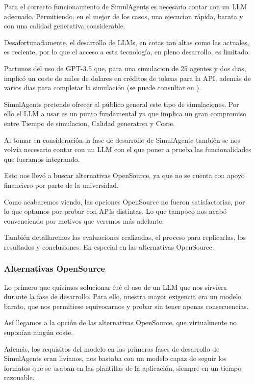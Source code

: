 Para el correcto funcionamiento de SimulAgents es necesario contar con un LLM adecuado. Permitiendo, en el mejor de los casos, una ejecucion rápida, barata y con una calidad generativa considerable.

Desafortunadamente, el desarrollo de LLMs, en cotas tan altas como las actuales, es reciente, por lo que el acceso a esta tecnología, en pleno desarrollo, es limitado.

Partimos del uso de GPT-3.5 que, para una simulacion de 25 agentes y dos dias, implicó un coste de miles de dolares en créditos de tokens para la API, además de varios dias para completar la simulación (se puede consultar en \cite{park2023generative}).

SimulAgents pretende ofrecer al público general este tipo de simulaciones.
Por ello el LLM a usar es un punto fundamental ya que implica un gran compromiso entre Tiempo de simulacion, Calidad generativa y Coste.

Al tomar en consideración la fase de desarrollo de SimulAgents también se nos volvía necesario contar con un LLM con el que poner a prueba las funcionalidades que fueramos integrando.

Esto nos llevó a buscar alternativas OpenSource, ya que no se cuenta con apoyo financiero por parte de la universidad.

Como acabaremos viendo, las opciones OpenSource no fueron satisfactorias, por lo que optamos por probar con APIs distintas. Lo que tampoco nos acabó convenciendo por motivos que veremos más adelante.

También detallaremos las evaluaciones realizadas, el proceso para replicarlas, los resultados y conclusiones. En especial en las alternativas OpenSource.

\subsubsection{Alternativas OpenSource}

Lo primero que quisimos solucionar fué el uso de un LLM que nos sirviera durante la fase de desarrollo. Para ello, nuestra mayor exigencia era un modelo barato, que nos permitiese equivocarnos y probar sin tener apenas consecuencias.

Así llegamos a la opción de las alternativas OpenSource, que virtualmente no suponían ningún coste. 

Además, los requisitos del modelo en las primeras fases de desarrollo de SimulAgents eran livianos, nos bastaba con un modelo capaz de seguir los formatos que se usaban en las plantillas de la aplicación, siempre en un tiempo razonable.


